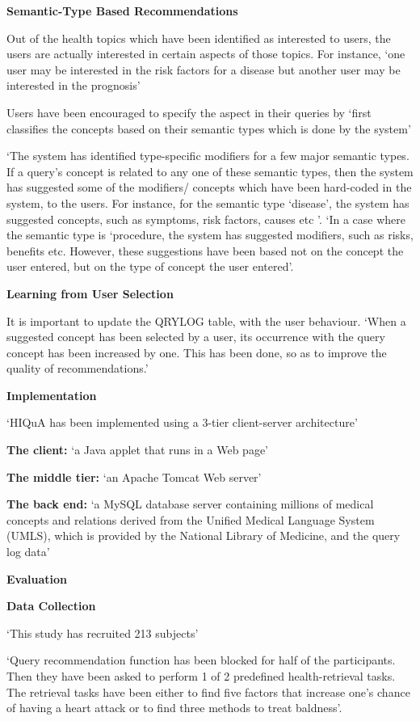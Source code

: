 \documentclass[]{article}
\begin{document}
\textbf{Semantic-Type Based Recommendations}

Out of the health topics which have been identified as interested to users, the users are actually interested in certain aspects of those topics. For instance, ‘one user may be interested in the risk factors for a disease but another user may be interested in the prognosis’

Users have been encouraged to specify the aspect in their queries by ‘first classifies the concepts based on their semantic types which is done by the system’

‘The system has identified type-specific modifiers for a few major semantic types. If a query’s  concept is related to any one of these semantic types, then the system has suggested some of the modifiers/ concepts which have been hard-coded in the system, to the users. For instance, for the semantic type ‘disease’, the system has suggested concepts, such as symptoms, risk factors, causes etc ’. ‘In a case where the semantic type is ‘procedure, the system has suggested modifiers, such as risks, benefits etc. However, these suggestions have been based not on the concept the user entered, but on the type of concept the user entered’. 

\textbf{Learning from User Selection}

It is important to update the QRYLOG table, with the user behaviour. ‘When a suggested concept has been selected by a user, its occurrence with the query concept has been increased by one. This has been done, so as to improve the quality of recommendations.’ 

\textbf{Implementation}

‘HIQuA has been implemented using a 3-tier client-server architecture’

\textbf{The client:} ‘a Java applet that runs in a Web page’

\textbf{The middle tier:} ‘an Apache Tomcat Web server’

\textbf{The back end:} ‘a MySQL database server containing millions of medical concepts and relations derived from the Unified Medical Language System (UMLS), which is provided by the National Library of Medicine, and the query log data’

\textbf{Evaluation}

\textbf{Data Collection}

‘This study has recruited 213 subjects’

‘Query recommendation function has been blocked for half of the participants. Then they have been asked to perform 1 of 2 predefined health-retrieval tasks. The retrieval tasks have been either to find five factors that increase one’s chance of having a heart attack or to find three methods to treat baldness’. 
\end{document}
